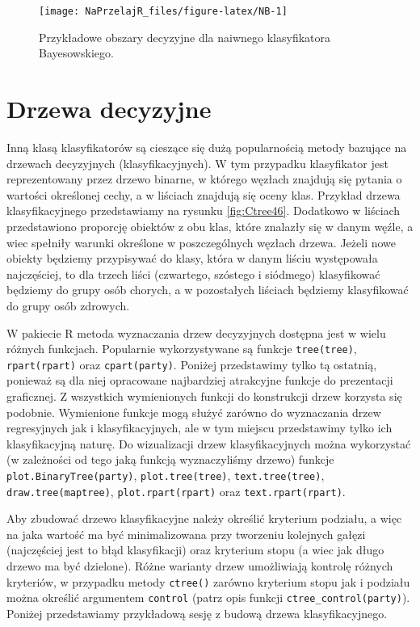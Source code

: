 \documentclass[polish,]{book}
\begin{document}
\begin{figure}[h]

{\centering \texttt{[image: NaPrzelajR\_files/figure-latex/NB-1]} 

}

\caption{Przykładowe obszary decyzyjne dla naiwnego klasyfikatora Bayesowskiego.}\label{fig:NB}
\end{figure}

\hypertarget{part_44}{%
\section{Drzewa decyzyjne}\label{part_44}}

Inną klasą klasyfikatorów są cieszące się dużą popularnością metody bazujące na
drzewach decyzyjnych (klasyfikacyjnych). W tym przypadku klasyfikator jest reprezentowany przez drzewo binarne, w którego węzłach znajdują się pytania o wartości
określonej cechy, a w liściach znajdują się oceny klas. Przykład drzewa klasyfikacyjnego przedstawiamy na rysunku \ref{fig:Ctree46}. Dodatkowo w liściach przedstawiono proporcję
obiektów z obu klas, które znalazły się w danym węźle, a wiec spełniły warunki
określone w poszczególnych węzłach drzewa. Jeżeli nowe obiekty będziemy przypisywać do klasy, która w danym liściu występowała najczęściej, to dla trzech liści
(czwartego, szóstego i siódmego) klasyfikować będziemy do grupy osób chorych, a w
pozostałych liściach będziemy klasyfikować do grupy osób zdrowych.

W pakiecie R metoda wyznaczania drzew decyzyjnych dostępna jest w wielu różnych funkcjach. Popularnie wykorzystywane są funkcje \texttt{tree(tree)}, \texttt{rpart(rpart)}
oraz \texttt{cpart(party)}. Poniżej przedstawimy tylko tą ostatnią, ponieważ są dla niej
opracowane najbardziej atrakcyjne funkcje do prezentacji graficznej. Z wszystkich
wymienionych funkcji do konstrukcji drzew korzysta się podobnie. Wymienione funkcje mogą służyć zarówno do wyznaczania drzew regresyjnych jak i klasyfikacyjnych, ale w tym miejscu przedstawimy tylko ich klasyfikacyjną naturę. Do wizualizacji drzew klasyfikacyjnych można wykorzystać (w zależności od tego jaką funkcją wyznaczyliśmy drzewo) funkcje \texttt{plot.BinaryTree(party)}, \texttt{plot.tree(tree)},
\texttt{text.tree(tree)}, \texttt{draw.tree(maptree)}, \texttt{plot.rpart(rpart)} oraz \texttt{text.rpart(rpart)}.

Aby zbudować drzewo klasyfikacyjne należy określić kryterium podziału, a więc
na jaka wartość ma być minimalizowana przy tworzeniu kolejnych gałęzi (najczęściej
jest to błąd klasyfikacji) oraz kryterium stopu (a wiec jak długo drzewo ma być dzielone). Różne warianty drzew umożliwiają kontrolę różnych kryteriów, w przypadku
metody \texttt{ctree()} zarówno kryterium stopu jak i podziału można określić argumentem \texttt{control} (patrz opis funkcji \texttt{ctree\_control(party)}). Poniżej przedstawiamy
przykładową sesję z budową drzewa klasyfikacyjnego.
\end{document}
